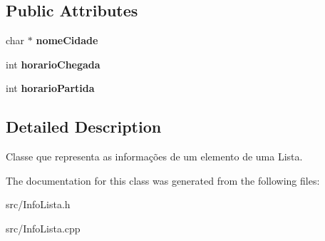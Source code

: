 \subsection*{\-Public \-Attributes}
\begin{DoxyCompactItemize}
\item 
\hypertarget{classInfoLista_a08bebfb6aaae0bda4208d971a83ef02e}{char $\ast$ {\bfseries nome\-Cidade}}\label{classInfoLista_a08bebfb6aaae0bda4208d971a83ef02e}

\item 
\hypertarget{classInfoLista_aac0f4ebd4ad7ca4276dbcccda74d6982}{int {\bfseries horario\-Chegada}}\label{classInfoLista_aac0f4ebd4ad7ca4276dbcccda74d6982}

\item 
\hypertarget{classInfoLista_a95f789e134082e37795c97974caa07bf}{int {\bfseries horario\-Partida}}\label{classInfoLista_a95f789e134082e37795c97974caa07bf}

\end{DoxyCompactItemize}


\subsection{\-Detailed \-Description}
\-Classe que representa as informações de um elemento de uma \-Lista. 

\-The documentation for this class was generated from the following files\-:\begin{DoxyCompactItemize}
\item 
src/\-Info\-Lista.\-h\item 
src/\-Info\-Lista.\-cpp\end{DoxyCompactItemize}
